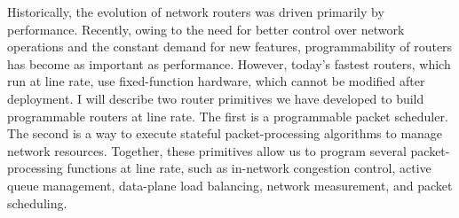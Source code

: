 % 
% 
%

Historically, the evolution of network routers was driven primarily by
performance. Recently, owing to the need for better control over
network operations and the constant demand for new features,
programmability of routers has become as important as performance.
However, today's fastest routers, which run at line rate, use
fixed-function hardware, which cannot be modified after deployment. I
will describe two router primitives we have developed to build
programmable routers at line rate. The first is a programmable packet
scheduler. The second is a way to execute stateful packet-processing
algorithms to manage network resources. Together, these primitives
allow us to program several packet-processing functions at line rate,
such as in-network congestion control, active queue management,
data-plane load balancing, network measurement, and packet scheduling.

